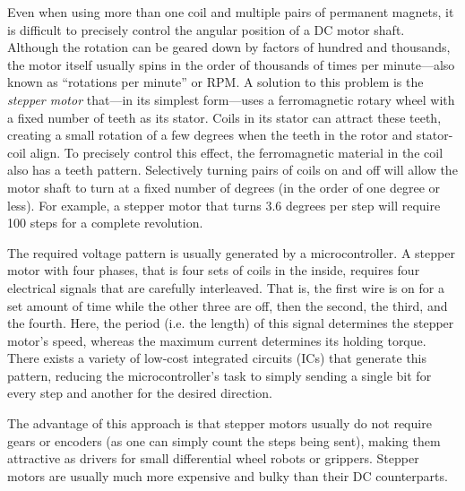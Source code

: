 Even when using more than one coil and multiple pairs of permanent magnets, it is difficult to precisely control the angular position of a DC motor shaft. Although the rotation can be geared down by factors of hundred and thousands, the motor itself usually spins in the order of thousands of times per minute---also known as ``rotations per minute'' or RPM.
%
A solution to this problem is the \textsl{stepper motor} that---in its simplest form---uses a ferromagnetic rotary wheel with a fixed number of teeth as its stator. Coils in its stator can attract these teeth, creating a small rotation of a few degrees when the teeth in the rotor and stator-coil align. To precisely control this effect, the ferromagnetic material in the coil also has a teeth pattern. Selectively turning pairs of coils on and off will allow the motor shaft to turn at a fixed number of degrees (in the order of one degree or less). For example, a stepper motor that turns 3.6 degrees per step will require 100 steps for a complete revolution.

The required voltage pattern is usually generated by a microcontroller. A stepper motor with four phases, that is four sets of coils in the inside, requires four electrical signals that are carefully interleaved. That is, the first wire is on for a set amount of time while the other three are off, then the second, the third, and the fourth.
Here, the period (i.e. the length) of this signal determines the stepper motor's speed, whereas the maximum current determines its holding torque.
There exists a variety of low-cost integrated circuits (ICs) that generate this pattern, reducing the microcontroller's task to simply sending a single bit for every step and another for the desired direction.

The advantage of this approach is that stepper motors usually do not require gears or encoders (as one can simply count the steps being sent), making them attractive as drivers for small differential wheel robots or grippers. Stepper motors are usually much more expensive and bulky than their DC counterparts.

